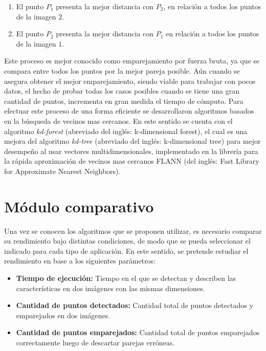 \begin{enumerate}[label=(\roman*)]
	\item El punto $P_{1}$ presenta la mejor distancia con $P_{2}$, en relación a todos los puntos de la imagen $2$.
	
	\item El punto $P_{2}$ presenta la mejor distancia con $P_{1}$ en relación a todos los puntos de la imagen $1$.
\end{enumerate}

Este proceso es mejor conocido como emparejamiento por fuerza bruta, ya que se compara entre todos los puntos por la mejor pareja posible. Aún cuando se asegura obtener el mejor emparejamiento, siendo viable para trabajar con pocos datos, el hecho de probar todas los casos posibles cuando se tiene una gran cantidad de puntos, incrementa en gran medida el tiempo de cómputo. Para efectuar este proceso de una forma eficiente se desarrollaron algoritmos basados en la búsqueda de vecinos mas cercanos. En este sentido se cuenta con el algoritmo \textit{kd-forest} (abreviado del inglés: k-dimensional forest), el cual es una mejora del algoritmo \textit{kd-tree} (abreviado del inglés: k-dimensional tree) para mejor desempeño al usar vectores multidimensionales, implementado en la librería para la rápida aproximación de vecinos mas cercanos FLANN \cite{flann} (del inglés: Fast Library for Approximate Nearest Neighbors).

\section{Módulo comparativo}

Una vez se conocen los algoritmos que se proponen utilizar, es necesario comparar su rendimiento bajo distintas condiciones, de modo que se pueda seleccionar el indicado para cada tipo de aplicación. En este sentido, se pretende estudiar el rendimiento en base a los siguientes parámetros:

\begin{itemize}
	\item \textbf{Tiempo de ejecución:} Tiempo en el que se detectan y describen las características en dos imágenes con las mismas dimensiones.
	
	\item \textbf{Cantidad de puntos detectados:} Cantidad total de puntos detectados y emparejados en dos imágenes.
	
	\item \textbf{Cantidad de puntos emparejados:} Cantidad total de puntos emparejados correctamente luego de descartar parejas erróneas. 
\end{itemize}


